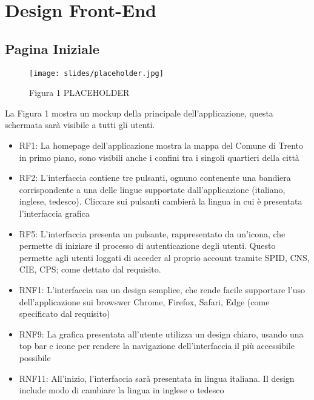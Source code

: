 \chapter{Design Front-End}
\thispagestyle{stdPage}


\section{Pagina Iniziale}

    \begin{figure}
        \texttt{[image: slides/placeholder.jpg]} %
        \caption{Figura 1 PLACEHOLDER}
    \end{figure}

    La Figura 1 mostra un mockup della principale dell'applicazione, questa schermata sarà visibile a tutti gli utenti.

    \begin{itemize} %
        \item RF1: La homepage dell'applicazione mostra la mappa del Comune di Trento in primo piano, sono visibili anche i confini tra i singoli quartieri della città
        \item RF2: L'interfaccia contiene tre pulsanti, ognuno contenente una bandiera corrispondente a una delle lingue supportate dall'applicazione (italiano, inglese, tedesco). Cliccare sui pulsanti cambierà la lingua in cui è presentata l'interfaccia grafica 
        \item RF5: L'interfaccia presenta un pulsante, rappresentato da un'icona, che permette di iniziare il processo di autenticazione degli utenti. Questo permette agli utenti loggati di acceder al proprio account tramite SPID, CNS, CIE, CPS; come dettato dal requisito.
        \item RNF1: L'interfaccia usa un design semplice, che rende facile supportare l'uso dell'applicazione sui browswer Chrome, Firefox, Safari, Edge (come specificato dal requisito)
        \item RNF9: La grafica presentata all'utente utilizza un design chiaro, usando una top bar e icone per rendere la navigazione dell'interfaccia il più accessibile possibile
        \item RNF11: All'inizio, l'interfaccia sarà presentata in lingua italiana. Il design include modo di cambiare la lingua in inglese o tedesco
    \end{itemize}




